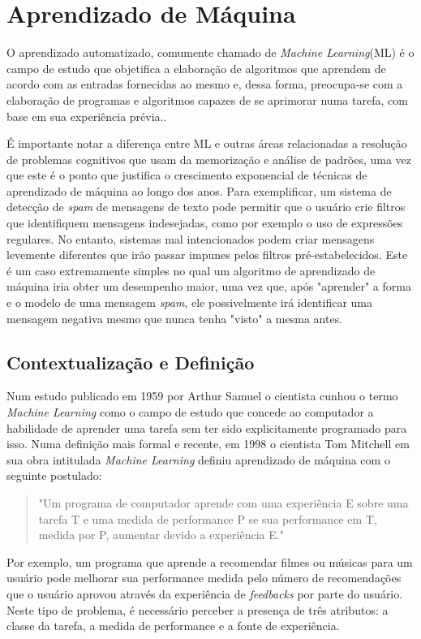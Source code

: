 
\chapter[Aprendizado de Máquina]{Aprendizado de Máquina} \label{cap:cap2}
O aprendizado automatizado, comumente chamado de \textit{Machine Learning}(ML) é o campo de estudo que objetifica a elaboração de algoritmos que aprendem de acordo com as entradas fornecidas ao mesmo e, dessa forma, preocupa-se com a elaboração de programas e algoritmos capazes de se aprimorar numa tarefa, com base em sua experiência prévia.\cite{Mitchell,Shalev-Shwartz:2014:UML:2621980, Barber:2012:BRM:2207809}. 

É importante notar a diferença entre ML e outras áreas relacionadas a resolução de problemas cognitivos que usam da memorização e análise de padrões, uma vez que este é o ponto que justifica o crescimento exponencial de técnicas de aprendizado de máquina ao longo dos anos. Para exemplificar, um sistema de detecção de \textit{spam} de mensagens de texto pode permitir que o usuário crie filtros que identifiquem mensagens indesejadas, como por exemplo o uso de expressões regulares. No entanto, sistemas mal intencionados podem criar mensagens levemente diferentes que irão passar impunes pelos filtros pré-estabelecidos. Este é um caso extremamente simples no qual um algoritmo de aprendizado de máquina iria obter um desempenho maior, uma vez que, após "aprender" a forma e o modelo de uma mensagem \textit{spam}, ele possivelmente irá identificar uma mensagem negativa mesmo que nunca tenha "visto" a mesma antes. \cite{Mitchell,Shalev-Shwartz:2014:UML:2621980}

\section{Contextualização e Definição}
Num estudo publicado em 1959 por Arthur Samuel \cite{FirstML} o cientista cunhou o termo \textit{Machine Learning} como o campo de estudo que concede ao computador a habilidade de aprender uma tarefa sem ter sido explicitamente programado para isso. Numa definição mais formal e recente, em 1998 o cientista Tom Mitchell em sua obra intitulada \textit{Machine Learning} definiu aprendizado de máquina com o seguinte postulado:
\begin{quote}
"Um programa de computador aprende com uma experiência E sobre uma tarefa T e uma medida de performance P se sua performance em T, medida por P, aumentar devido a experiência E."
\end{quote} \par
Por exemplo, um programa que aprende a recomendar filmes ou músicas para um usuário pode melhorar sua performance medida pelo número de recomendações que o usuário aprovou através da experiência de \textit{feedbacks} por parte do usuário. Neste tipo de problema, é necessário perceber a presença de três atributos: a classe da tarefa, a medida de performance e a fonte de experiência.\cite{Mitchell} \par

